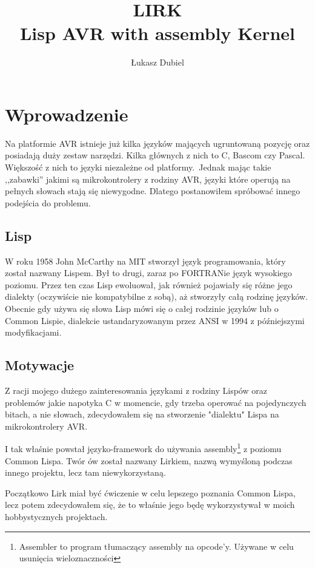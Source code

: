 \documentclass[11pt]{article}
\author{Łukasz Dubiel}
\title{LIRK \\ Lisp AVR with assembly Kernel}
\begin{document}
\maketitle

\section{Wprowadzenie}

Na platformie AVR istnieje już kilka języków mających ugruntowaną pozycję oraz posiadają duży zestaw narzędzi.
Kilka głównych z nich to C, Bascom czy Pascal.
Większość z nich to języki niezależne od platformy.\
Jednak mając takie ,,zabawki'' jakimi są mikrokontrolery z rodziny AVR,
języki które operują na pełnych słowach stają się niewygodne.
Dlatego postanowiłem spróbować innego podejścia do problemu.

\subsection{Lisp}

W roku 1958 John McCarthy na MIT stworzył język programowania, który został nazwany Lispem.
Był to drugi, zaraz po FORTRANie język wysokiego poziomu.
Przez ten czas Lisp ewoluował, jak również pojawiały się różne jego dialekty (oczywiście nie kompatybilne z sobą), aż stworzyły całą rodzinę języków.
Obecnie gdy używa się słowa Lisp mówi się o całej rodzinie języków lub o Common Lispie,
dialekcie ustandaryzowanym przez ANSI w 1994 z późniejszymi modyfikacjami.

\subsection{Motywacje}

Z racji mojego dużego zainteresowania językami z rodziny Lispów
oraz problemów jakie napotyka C w momencie, gdy trzeba operować na pojedynczych bitach,
a nie słowach, zdecydowałem się na stworzenie "dialektu" Lispa na mikrokontrolery AVR.

I tak właśnie powstał języko-framework do używania assembly\footnote{Assembler to program tłumaczący assembly na opcode'y. Używane w celu usunięcia wieloznaczności}
z poziomu Common Lispa.
Twór ów został nazwany Lirkiem, nazwą wymyśloną podczas innego projektu,
lecz tam niewykorzystaną. 


Początkowo Lirk miał być ćwiczenie w celu lepszego poznania Common Lispa,
lecz potem zdecydowałem się, że to właśnie jego będę wykorzystywał w moich hobbystycznych projektach.
\end{document}
